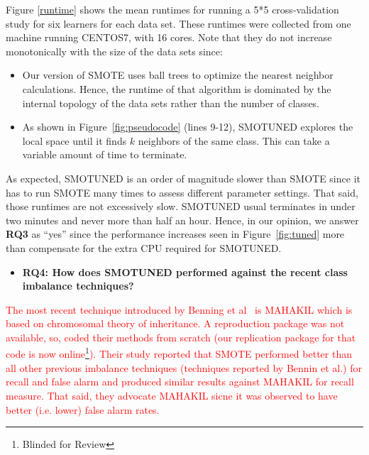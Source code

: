 \documentclass[sigconf,review, anonymous]{acmart}
\newcommand{\bi}{\begin{itemize}[leftmargin=0.4cm]}
\newcommand{\ei}{\end{itemize}}
\theoremstyle{break}
\theoremstyle{break}
\newcommand{\sma}{{\sc SMOTE}}
\newcommand{\smb}{{\sc SMOTUNED}}
\begin{document}
Figure \ref{runtime} shows the mean runtimes
for running a 5*5 cross-validation study for six learners for each data set.
These runtimes were collected from one machine running CENTOS7, with 16 cores.
Note that they do not increase monotonically with the size of the data sets since:
\bi
\item Our version of {\sma} uses ball trees to optimize the nearest neighbor calculations. Hence, the runtime of that algorithm is dominated by the internal topology of the data sets rather than the number of classes.
\item
As shown in 
Figure~\ref{fig:pseudocode} (lines 9-12),
{\smb} explores the local space until it finds $k$ neighbors of the same class. This can take a variable amount of time to terminate.
\ei
As expected,  {\smb} is an order of magnitude slower than {\sma} since
it has to run {\sma} many times to assess different parameter settings.
That said, those runtimes are not excessively slow.
{\smb} usual terminates in under two minutes and never more than half an hour.
Hence, in  our opinion, we answer {\bf RQ3} as ``yes'' since the   performance increases
seen in Figure~\ref{fig:tuned} more than compensate for the extra CPU required for {\smb}.

\bi
\item{\bf RQ4: How does {\smb} performed against the recent class imbalance techniques?}
\ei

\textcolor{red}{The most recent technique introduced by Benning et al~\cite{bennin2017mahakil} is MAHAKIL which is based on chromosomal theory of inheritance. A reproduction package was not available, so, coded their methods from scratch (our replication package for that code is now online\footnote{Blinded for Review}).}
\textcolor{red}{Their study reported that {\sma} performed better than all other previous imbalance techniques (techniques reported by Bennin et al.) for recall and false alarm and produced similar results against MAHAKIL for recall measure. That said, they advocate MAHAKIL sicne it was observed
to have better  (i.e. lower) false alarm rates.}

\end{document}
